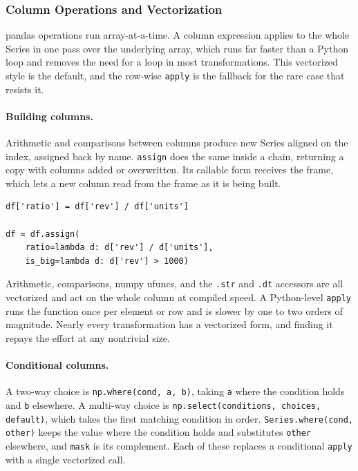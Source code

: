 \subsubsection{Column Operations and Vectorization}

pandas operations run array-at-a-time. A column expression applies to the whole Series in one pass over the underlying array, which runs far faster than a Python loop and removes the need for a loop in most transformations. This vectorized style is the default, and the row-wise \texttt{apply} is the fallback for the rare case that resists it.

\paragraph{Building columns.} Arithmetic and comparisons between columns produce new Series aligned on the index, assigned back by name. \texttt{assign} does the same inside a chain, returning a copy with columns added or overwritten. Its callable form receives the frame, which lets a new column read from the frame as it is being built.

\begin{lstlisting}[style=python, caption={Direct assignment and the chainable assign}]
df['ratio'] = df['rev'] / df['units']

df = df.assign(
    ratio=lambda d: d['rev'] / d['units'],
    is_big=lambda d: d['rev'] > 1000)
\end{lstlisting}

\begin{keybox}
Arithmetic, comparisons, numpy ufuncs, and the \texttt{.str} and \texttt{.dt} accessors are all vectorized and act on the whole column at compiled speed. A Python-level \texttt{apply} runs the function once per element or row and is slower by one to two orders of magnitude. Nearly every transformation has a vectorized form, and finding it repays the effort at any nontrivial size.
\end{keybox}

\vspace{1ex}

\paragraph{Conditional columns.} A two-way choice is \texttt{np.where(cond, a, b)}, taking \texttt{a} where the condition holds and \texttt{b} elsewhere. A multi-way choice is \texttt{np.select(conditions, choices, default)}, which takes the first matching condition in order. \texttt{Series.where(cond, other)} keeps the value where the condition holds and substitutes \texttt{other} elsewhere, and \texttt{mask} is its complement. Each of these replaces a conditional \texttt{apply} with a single vectorized call.

